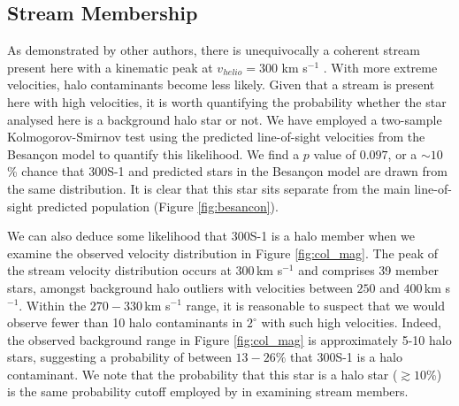 \documentclass{emulateapj}
\begin{document}
\subsection{Stream Membership}
As demonstrated by other authors, there is unequivocally a coherent
stream present here with a kinematic peak at $v_{helio} = 300$ km
s$^{-1}$ \citep{Geha2009, Norris2010a, Simon2011}. With more extreme
velocities, halo contaminants become less likely. Given that a stream
is present here with high velocities, it is worth quantifying the
probability whether the star analysed here is a background halo star
or not. We have employed a two-sample Kolmogorov-Smirnov test using
the predicted line-of-sight velocities from the Besan\c{c}on model
\citep{Robin2003} to quantify this likelihood. We find a $p$ value of
$0.097$, or a $\sim10$\% chance that 300S-1 and predicted stars in the
Besan\c{c}on model \citep{Robin2003} are drawn from the same
distribution. It is clear that this star sits separate from the main
line-of-sight predicted population (Figure \ref{fig:besancon}).

We can also deduce some likelihood that 300S-1 is a halo member when
we examine the observed velocity distribution in Figure
\ref{fig:col_mag}. The peak of the stream velocity distribution occurs
at $300$\,km s$^{-1}$ and comprises 39 member stars, amongst
background halo outliers with velocities between $250$ and $400$\,km
s$^{-1}$. Within the $270-330$\,km s$^{-1}$ range, it is reasonable to
suspect that we would observe fewer than 10 halo contaminants in
$2^{\circ}$ with such high velocities. Indeed, the observed background
range in Figure \ref{fig:col_mag} is approximately 5-10 halo stars,
suggesting a probability of between $13-26\%$ that 300S-1 is a halo
contaminant. We note that the probability that this star is a halo
star ($\gtrsim10$\%) is the same probability cutoff employed by
\citet{Simon2011} in examining stream members.
\end{document}
